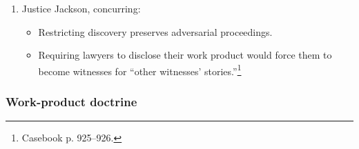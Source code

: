 \begin{enumerate}
\begin{itemize}
        \item The attorney-client privilege is not an appropriate framework to answer the question in this case because that privilege does not cover witness interviews or subsequent memoranda, etc.
        \item Here, Hinckman has requested information that he could have discovered for himself (e.g., testimony of known witnesses). Hinckman has failed to show that disclosure of these materials is necessary or that nondisclosure would lead to injustice.
        \item Requiring disclosure of an attorney's work product would lead to ``[i]nefficiency, unfairness, and sharp practices.''\footnote{Casebook p. 923.}
        \item Affirmed.
    \end{itemize}
    \item Justice Jackson, concurring:
    \begin{itemize}
        \item Restricting discovery preserves adversarial proceedings.
        \item Requiring lawyers to disclose their work product would force them to become witnesses for ``other witnesses' stories.''\footnote{Casebook p. 925--926.}
    \end{itemize}
\end{enumerate}

\subsubsection{Work-product doctrine}

